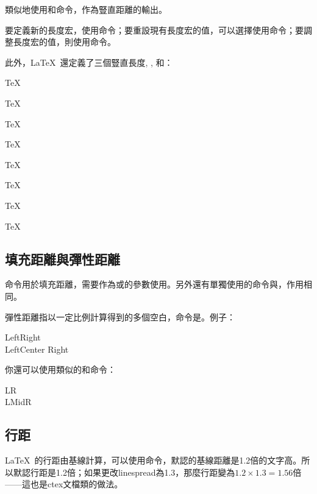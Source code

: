 類似地使用和命令，作為豎直距離的輸出。

要定義新的長度宏，使用命令；要重設現有長度宏的值，可以選擇使用命令；要調整長度宏的值，則使用命令。
\begin{latex}
\newlength{\mylatexlength}
\setlength{\mylatexlength}{10pt}
\addtolength{\mylatexlength}{-5pt}
\end{latex}

此外，\LaTeX\ 還定義了三個豎直長度, , 和：

\begin{codeshow}
\parbox[t]{3em}{TeX\par TeX}
\parbox[t]{3em}{TeX\par\smallskip TeX}
\parbox[t]{3em}{TeX\par\medskip TeX}
\parbox[t]{3em}{TeX\par\bigskip TeX}
\end{codeshow}

\subsection{填充距離與彈性距離}
命令用於填充距離，需要作為或的參數使用。另外還有單獨使用的命令與，作用相同。

彈性距離指以一定比例計算得到的多個空白，命令是。例子：

\begin{codeshow}
Left\hspace{\fill}Right\\
LeftCenter
Right
\end{codeshow}

你還可以使用類似的和命令：

\begin{codeshow}
L\hfill R\\
L\hrulefill Mid\dotfill R
\end{codeshow}

\subsection{行距}
\LaTeX\ 的行距由基線計算，可以使用命令，默認的基線距離是1.2倍的文字高。所以默認行距是1.2倍；如果更改linespread為1.3，那麼行距變為$1.2\times 1.3=1.56$倍——這也是ctex文檔類的做法。

